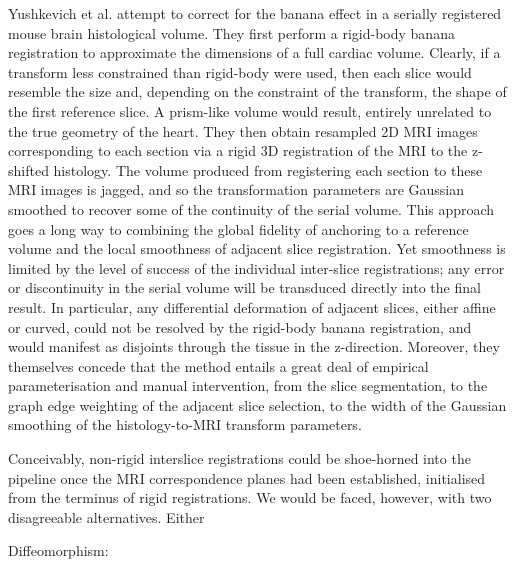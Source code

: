   Yushkevich et al. \cite{Yushkevich2006} attempt to correct for the banana effect in a serially registered mouse brain histological volume. They first perform a rigid-body banana registration to approximate the dimensions of a full cardiac volume. Clearly, if a transform less constrained than rigid-body were used, then each slice would resemble the size and, depending on the constraint of the transform, the shape of the first reference slice. A prism-like volume would result, entirely unrelated to the true geometry of the heart. They then obtain resampled 2D MRI images corresponding to each section via a rigid 3D registration of the MRI to the z-shifted histology. The volume produced from registering each section to these MRI images is jagged, and so the transformation parameters are Gaussian smoothed to recover some of the continuity of the serial volume. This approach goes a long way to combining the global fidelity of anchoring to a reference volume and the local smoothness of adjacent slice registration. Yet smoothness is limited by the level of success of the individual inter-slice registrations; any error or discontinuity in the serial volume will be transduced directly into the final result. In particular, any differential deformation of adjacent slices, either affine or curved, could not be resolved by the rigid-body banana registration, and would manifest as disjoints through the tissue in the z-direction. Moreover, they themselves concede that the method entails a great deal of empirical parameterisation and manual intervention, from the slice segmentation, to the graph edge weighting of the adjacent slice selection, to the width of the Gaussian smoothing of the histology-to-MRI transform parameters.
  
  Conceivably, non-rigid interslice registrations could be shoe-horned into the pipeline once the MRI correspondence planes had been established, initialised from the terminus of rigid registrations. We would be faced, however, with two disagreeable alternatives. Either 
  
  Diffeomorphism: \cite{Avants2006}
  
